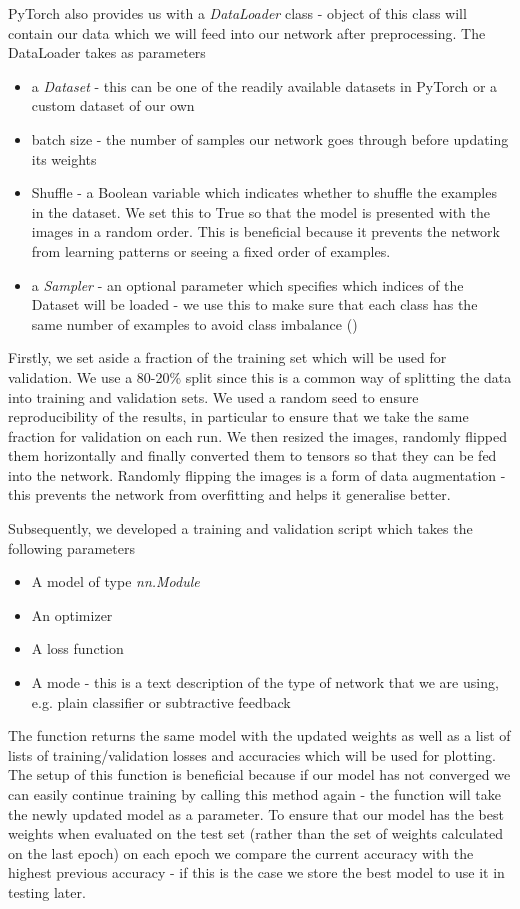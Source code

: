 \documentclass{l4proj}
\begin{document}
PyTorch also provides us with a \textit{DataLoader} class - object of this class will contain our data which we will feed into our network after preprocessing. The DataLoader takes as parameters
\begin{itemize}
    \item a \textit{Dataset} - this can be one of the readily available datasets in PyTorch or a custom dataset of our own
    \item batch size - the number of samples our network goes through before updating its weights
    \item Shuffle - a Boolean variable which indicates whether to shuffle the examples in the dataset. We set this to True so that the model is presented with the images in a random order. This is beneficial because it prevents the network from learning patterns or seeing a fixed order of examples.
    \item a \textit{Sampler} - an optional parameter which specifies which indices of the Dataset will be loaded - we use this to make sure that each class has the same number of examples to avoid class imbalance (\cite{classimb})
    
\end{itemize}

Firstly, we set aside a fraction of the training set which will be used for validation. We use a 80-20\% split since this is a common way of splitting the data into training and validation sets. We used a random seed to ensure reproducibility of the results, in particular to ensure that we take the same fraction for validation on each run. We then resized the images, randomly flipped them horizontally and finally converted them to tensors so that they can be fed into the network.
Randomly flipping the images is a form of data augmentation - this prevents the network from overfitting and helps it generalise better.

Subsequently, we developed a training and validation script which takes the following parameters
\begin{itemize}
    \item A model of type \textit{nn.Module}
    \item An optimizer
    \item A loss function
    \item A mode - this is a text description of the type of network that we are using, e.g. plain classifier or subtractive feedback
\end{itemize}
The function returns the same model with the updated weights as well as a list of lists of training/validation losses and accuracies which will be used for plotting. The setup of this function is beneficial because if our model has not converged we can easily continue training by calling this method again - the function will take the newly updated model as a parameter. To ensure that our model has the best weights when evaluated on the test set (rather than the set of weights calculated on the last epoch) on each epoch we compare the current accuracy with the highest previous accuracy - if this is the case we store the best model to use it in testing later.
\end{document}
